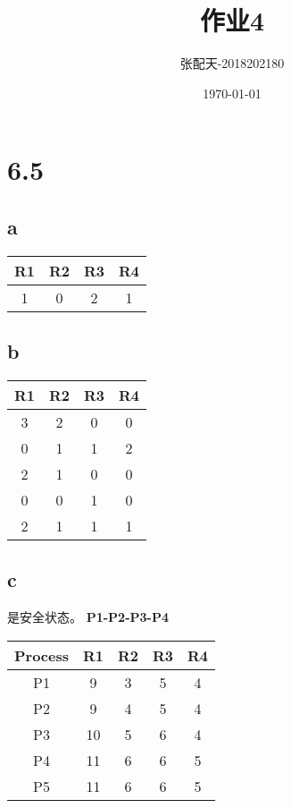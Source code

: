 \documentclass[UTF8]{ctexart}
\title{作业4}
\author{张配天-2018202180}
\date{\today}
\begin{document}
\maketitle
    \section{6.5}
    \subsection{a}
    \begin{table}[htb]
    \centering
        \begin{tabular}{cccc}
            \hline
            R1&R2&R3&R4\\
            \hline
            1&0&2&1\\
            \hline
        \end{tabular}
    \end{table}
    \subsection{b}
    \begin{table}[htb]
        \centering
        \begin{tabular}{cccc}
            \hline
            R1&R2&R3&R4\\
            \hline
            3&2&0&0\\
            0&1&1&2\\
            2&1&0&0\\
            0&0&1&0\\
            2&1&1&1\\
            \hline
        \end{tabular}
    \end{table}
    \subsection{c}
    是安全状态。
    \textbf{P1-P2-P3-P4}
    \begin{table}[htb]
        \centering
        \begin{tabular}{ccccc}
            \hline
            Process&R1&R2&R3&R4\\
            \hline
            P1&9&3&5&4\\
            P2&9&4&5&4\\
            P3&10&5&6&4\\
            P4&11&6&6&5\\
            P5&11&6&6&5\\
            \hline
        \end{tabular}
    \end{table}
\end{document}
